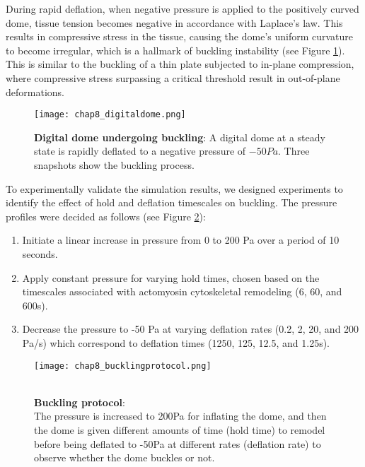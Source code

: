 During rapid deflation, when negative pressure is applied to the positively curved dome, tissue tension becomes negative in accordance with Laplace's law. This results in compressive stress in the tissue, causing the dome's uniform curvature to become irregular, which is a hallmark of buckling instability (see Figure \ref{fig_8_1}). This is similar to the buckling of a thin plate subjected to in-plane compression, where compressive stress surpassing a critical threshold result in out-of-plane deformations. 

\begin{figure}
	\centering
	\texttt{[image: chap8\_digitaldome.png]}
	\caption{\label{fig_8_1} \textbf{Digital dome undergoing buckling}: A digital dome at a steady state is rapidly deflated to a negative pressure of $-50Pa$. Three snapshots show the buckling process.
	}
\end{figure}

To experimentally validate the simulation results, we designed experiments to identify the effect of hold and deflation timescales on buckling.  The pressure profiles were decided as follows (see Figure \ref{fig_8_2}):

\begin{enumerate}
	\item Initiate a linear increase in pressure from 0 to 200 Pa over a period of 10 seconds.
	\item Apply constant pressure for varying hold times, chosen based on the timescales associated with actomyosin cytoskeletal remodeling (6, 60, and 600s).
	\item Decrease the pressure to -50 Pa at varying deflation rates (0.2, 2, 20, and 200 Pa/s) which correspond to deflation times (1250, 125, 12.5, and 1.25s).
\end{enumerate}

\begin{figure}
	\begin{minipage}[c]{0.6\textwidth}
		\texttt{[image: chap8\_bucklingprotocol.png]}
	\end{minipage}\hfill
	\begin{minipage}[c]{0.35\textwidth}
		\caption{\\ \textbf{Buckling protocol}:\\ The pressure is increased to 200Pa for inflating the dome, and then the dome is given different amounts of time (hold time) to remodel before being deflated to -50Pa at different rates (deflation rate) to observe whether the dome buckles or not.	} \label{fig_8_2}
	\end{minipage}
\end{figure}

